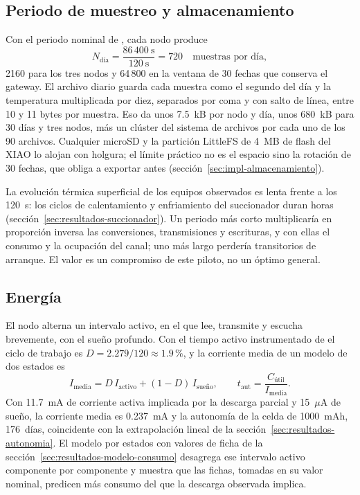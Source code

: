\subsection{Periodo de muestreo y almacenamiento}
Con el periodo nominal de \PeriodoNominal{}, cada nodo produce
\begin{equation}
N_{\text{día}}=\frac{86\,400~\mathrm{s}}{120~\mathrm{s}}=720\quad\text{muestras por día},
\label{eq:fund-muestras}
\end{equation}
2160 para los tres nodos y 64\,800 en la ventana de 30 fechas que conserva el gateway. El archivo diario guarda cada muestra como el segundo del día y la temperatura multiplicada por diez, separados por coma y con salto de línea, entre 10 y 11 bytes por muestra. Eso da unos 7.5~kB por nodo y día, unos 680~kB para 30 días y tres nodos, más un clúster del sistema de archivos por cada uno de los 90 archivos. Cualquier microSD y la partición LittleFS de 4~MB de flash del XIAO lo alojan con holgura; el límite práctico no es el espacio sino la rotación de 30 fechas, que obliga a exportar antes (sección~\ref{sec:impl-almacenamiento}).

La evolución térmica superficial de los equipos observados es lenta frente a los 120~s: los ciclos de calentamiento y enfriamiento del succionador duran horas (sección~\ref{sec:resultados-succionador}). Un periodo más corto multiplicaría en proporción inversa las conversiones, transmisiones y escrituras, y con ellas el consumo y la ocupación del canal; uno más largo perdería transitorios de arranque. El valor es un compromiso de este piloto, no un óptimo general.

\subsection{Energía}
El nodo alterna un intervalo activo, en el que lee, transmite y escucha brevemente, con el sueño profundo. Con el tiempo activo instrumentado de \TiempoActivo{} el ciclo de trabajo es $D=2.279/120\approx1.9\,\text{\%}$, y la corriente media de un modelo de dos estados es
\begin{equation}
I_{\mathrm{media}}=D\,I_{\mathrm{activo}}+(1-D)\,I_{\text{sueño}},\qquad t_{\mathrm{aut}}=\frac{C_{\text{útil}}}{I_{\mathrm{media}}}.
\label{eq:fund-energia}
\end{equation}
Con 11.7~mA de corriente activa implicada por la descarga parcial y 15~$\mu$A de sueño, la corriente media es 0.237~mA y la autonomía de la celda de 1000~mAh, 176~días, coincidente con la extrapolación lineal de la sección~\ref{sec:resultados-autonomia}. El modelo por estados con valores de ficha de la sección~\ref{sec:resultados-modelo-consumo} desagrega ese intervalo activo componente por componente y muestra que las fichas, tomadas en su valor nominal, predicen más consumo del que la descarga observada implica.

